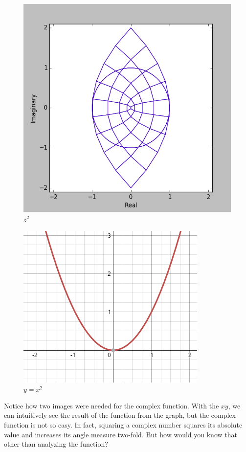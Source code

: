 \documentclass{article}
\begin{document}
    \begin{figure}[h]
        \centering
        \includegraphics[scale=.5]{z2}
        \caption{$z^{2}$}
        \label{fig:my_label}
    \end{figure}
    \begin{figure}[h]
        \centering
        \includegraphics[scale=.66]{x2}
        \caption{$y=x^{2}$}
        \label{fig:my_label}
    \end{figure}
    Notice how two images were needed for the complex function. With the $xy$, we can intuitively see the result of the function from the graph, but the complex function is not so easy. In fact, squaring a complex number squares its absolute value and increases its angle measure two-fold. But how would you know that other than analyzing the function?\\
\end{document}
